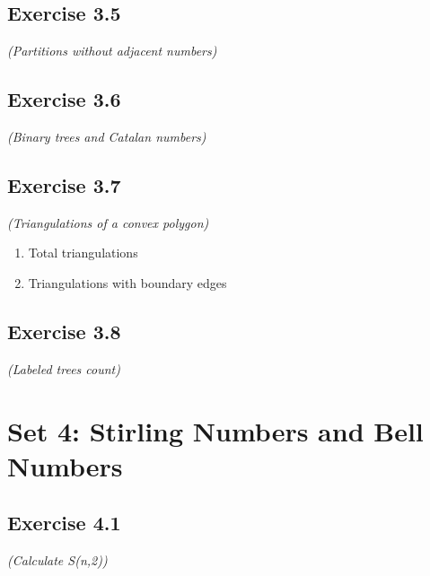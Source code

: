 \documentclass[12pt,a4paper]{article}
\begin{document}
\vspace{1cm}

\subsection*{Exercise 3.5}
\textit{(Partitions without adjacent numbers)}

\vspace{1cm}

\subsection*{Exercise 3.6}
\textit{(Binary trees and Catalan numbers)}

\vspace{1cm}

\subsection*{Exercise 3.7}
\textit{(Triangulations of a convex polygon)}

\begin{enumerate}[label=(\roman*)]
\item Total triangulations
\vspace{1cm}

\item Triangulations with boundary edges
\vspace{1cm}
\end{enumerate}

\subsection*{Exercise 3.8}
\textit{(Labeled trees count)}

\vspace{1cm}

\section{Set 4: Stirling Numbers and Bell Numbers}

\subsection*{Exercise 4.1}
\textit{(Calculate S(n,2))}

\vspace{1cm}
\end{document}
